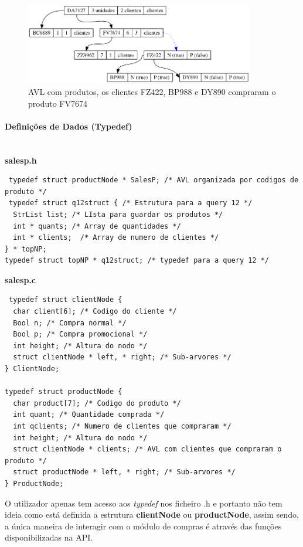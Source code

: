 \documentclass[10pt] {article}
\begin{document}
\begin{figure}[ht!]
\centering
\includegraphics[width=100mm]{avl_salesp.png}
\caption{AVL com produtos, os clientes FZ422, BP988 e DY890 compraram o produto FV7674}
\end{figure}

 \paragraph {Definições de Dados (Typedef)}\mbox{}\\
 \textbf{salesp.h}
 \begin{lstlisting}
 typedef struct productNode * SalesP; /* AVL organizada por codigos de produto */
 typedef struct q12struct { /* Estrutura para a query 12 */
  StrList list; /* LIsta para guardar os produtos */
  int * quants; /* Array de quantidades */
  int * clients;  /* Array de numero de clientes */
} * topNP;
typedef struct topNP * q12struct; /* typedef para a query 12 */

 \end{lstlisting}
 \textbf{salesp.c}
 \begin{lstlisting}
 typedef struct clientNode {
  char client[6]; /* Codigo do cliente */
  Bool n; /* Compra normal */
  Bool p; /* Compra promocional */
  int height; /* Altura do nodo */
  struct clientNode * left, * right; /* Sub-arvores */
} ClientNode;

typedef struct productNode {
  char product[7]; /* Codigo do produto */
  int quant; /* Quantidade comprada */
  int qclients; /* Numero de clientes que compraram */
  int height; /* Altura do nodo */
  struct clientNode * clients; /* AVL com clientes que compraram o produto */
  struct productNode * left, * right; /* Sub-arvores */
} ProductNode;
\end{lstlisting}

 \par O utilizador apenas tem acesso aos \emph{typedef} nos ficheiro .h e portanto não tem ideia como está
 definida a estrutura \textbf{clientNode} ou \textbf{productNode}, assim sendo, a única maneira de interagir com o
 módulo de compras é através das funções disponibilizadas na API.
\end{document}
